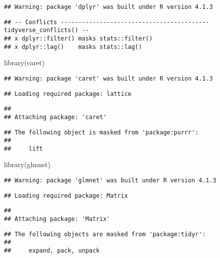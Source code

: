 \documentclass[
]{article}
\newenvironment{Shaded}{\begin{snugshade}}{\end{snugshade}}
\newcommand{\FunctionTok}[1]{\textcolor[rgb]{0.00,0.00,0.00}{#1}}
\newcommand{\NormalTok}[1]{#1}
\begin{document}
\begin{verbatim}
## Warning: package 'dplyr' was built under R version 4.1.3
\end{verbatim}

\begin{verbatim}
## -- Conflicts ------------------------------------------ tidyverse_conflicts() --
## x dplyr::filter() masks stats::filter()
## x dplyr::lag()    masks stats::lag()
\end{verbatim}

\begin{Shaded}
\begin{Highlighting}[]
\FunctionTok{library}\NormalTok{(caret)}
\end{Highlighting}
\end{Shaded}

\begin{verbatim}
## Warning: package 'caret' was built under R version 4.1.3
\end{verbatim}

\begin{verbatim}
## Loading required package: lattice
\end{verbatim}

\begin{verbatim}
## 
## Attaching package: 'caret'
\end{verbatim}

\begin{verbatim}
## The following object is masked from 'package:purrr':
## 
##     lift
\end{verbatim}

\begin{Shaded}
\begin{Highlighting}[]
\FunctionTok{library}\NormalTok{(glmnet)}
\end{Highlighting}
\end{Shaded}

\begin{verbatim}
## Warning: package 'glmnet' was built under R version 4.1.3
\end{verbatim}

\begin{verbatim}
## Loading required package: Matrix
\end{verbatim}

\begin{verbatim}
## 
## Attaching package: 'Matrix'
\end{verbatim}

\begin{verbatim}
## The following objects are masked from 'package:tidyr':
## 
##     expand, pack, unpack
\end{verbatim}
\end{document}
